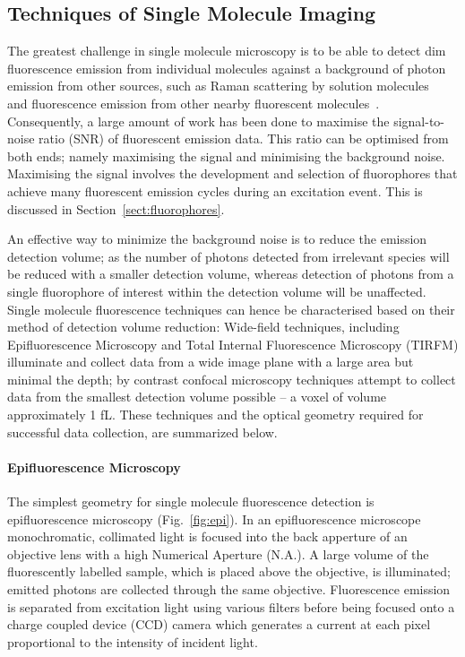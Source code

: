 \subsection{Techniques of Single Molecule Imaging}
The greatest challenge in single molecule microscopy is to be able to detect dim fluorescence emission from individual molecules against a background of photon emission from other sources, such as Raman scattering by solution molecules~\cite{???} and fluorescence emission from other nearby fluorescent molecules~\cite{???}. Consequently, a large amount of work has been done to maximise the signal-to-noise ratio (SNR) of fluorescent emission data. This ratio can be optimised from both ends; namely maximising the signal and minimising the background noise. Maximising the signal involves the development and selection of fluorophores that achieve many fluorescent emission cycles during an excitation event. This is discussed in Section~\ref{sect:fluorophores}. 

An effective way to minimize the background noise is to reduce the emission detection volume; as the number of photons detected from irrelevant species will be reduced with a smaller detection volume, whereas detection of photons from a single fluorophore of interest within the detection volume will be unaffected. Single molecule fluorescence techniques can hence be characterised based on their method of detection volume reduction: Wide-field techniques, including Epifluorescence Microscopy and Total Internal Fluorescence Microscopy (TIRFM) illuminate and collect data from a wide image plane with a large area but minimal the depth; by contrast confocal microscopy techniques attempt to collect data from the smallest detection volume possible -- a voxel of volume approximately 1 fL. These techniques and the optical geometry required for successful data collection, are summarized below. 

\paragraph{Epifluorescence Microscopy}
The simplest geometry for single molecule fluorescence detection is epifluorescence microscopy (Fig.~\ref{fig:epi}). In an epifluorescence microscope monochromatic, collimated light is focused into the back apperture of an objective lens with a high Numerical Aperture (N.A.). A large volume of the fluorescently labelled sample, which is placed above the objective, is illuminated; emitted photons are collected through the same objective. Fluorescence emission is separated from excitation light using various filters before being focused onto a charge coupled device (CCD) camera which generates a current at each pixel proportional to the intensity of incident light.

